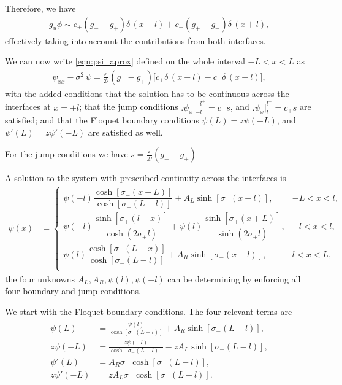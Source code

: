 \documentclass[a4paper,10pt]{article}
\newcommand{\dE}{\ensuremath{\delta\,}}
\newcommand{\sI}{\ensuremath{\sigma}}
\newcommand{\Ep}{\ensuremath{\varepsilon\,}}
\newcommand{\DD}{\ensuremath{\mathcal{D}}}
\begin{document}
Therefore, we have
% 
\begin{equation*}
\begin{split}
	g_u\phi\sim c_+(g_- - g_+)\dE(x-l) + c_-(g_+ - g_-)\dE(x+l),
\end{split}
\end{equation*}
% 
effectively taking into account the contributions from both interfaces.

We can now write \eqref{eqn:psi_aprox} defined on the whole interval $-L<x<L$ as
% 
\begin{equation*}
\begin{split}
	\psi_{xx} - \sI_{\pm}^2\psi = \frac{\Ep}{\DD}(g_- - g_+)\big[c_+\dE(x-l) - c_-\dE(x+l)\big],
\end{split}
\end{equation*}
% 
with the added conditions that the solution has to be continuous across the interfaces at $x=\pm l$; that the jump conditions $\Big.\psi_x\Big|_{-l^-}^{-l^+} = c_-s$, and $\Big.\psi_x\Big|_{l^+}^{l^-} = c_+s$ are satisfied; and that the Floquet boundary conditions $\psi(L) = z\psi(-L)$, and $\psi'(L) = z\psi'(-L)$ are satisfied as well. 

For the jump conditions we have $s = \frac{\Ep}{\DD}(g_--g_+)$

A solution to the system with prescribed continuity across the interfaces is
% 
\begin{equation*}
	\begin{split}
	\psi(x) &= \left\{
	\begin{matrix}
	  \psi(-l)\dfrac{\cosh[\sI_-(x+L)]}{\cosh[\sI_-(L-l)]} + A_L\sinh[\sI_-(x+l)],&-L<x<l,\\
	  \psi(-l)\dfrac{\sinh[\sI_+(l-x)]}{\cosh(2\sI_+l)} + \psi(l)\dfrac{\sinh[\sI_+(x+L)]}{\sinh(2\sI_+l)},&-l<x<l,\\
	  \psi(l)\dfrac{\cosh[\sI_-(L-x)]}{\cosh[\sI_-(L-l)]} + A_R\sinh[\sI_-(x-l)],&l<x<L,\\
	\end{matrix}\right.
	\end{split}
\end{equation*}
% 
the four unknowns $A_L, A_R, \psi(l), \psi(-l)$ can be determining by enforcing all four boundary and jump conditions.

We start with the Floquet boundary conditions. The four relevant terms are
% 
\begin{equation*}
\begin{split}
\begin{aligned}
	\psi(L) &= \frac{\psi(l)}{\cosh[\sI_-(L-l)]} + A_R\sinh[\sI_-(L-l)],\\
	z\psi(-L) &= \frac{z\psi(-l)}{\cosh[\sI_-(L-l)]} - zA_L\sinh[\sI_-(L-l)],\\
	\psi'(L) &= A_R\sI_-\cosh[\sI_-(L-l)],\\
	z\psi'(-L) &= zA_L\sI_-\cosh[\sI_-(L-l)].\\
\end{aligned}
\end{split}
\end{equation*}
% 
\end{document}
